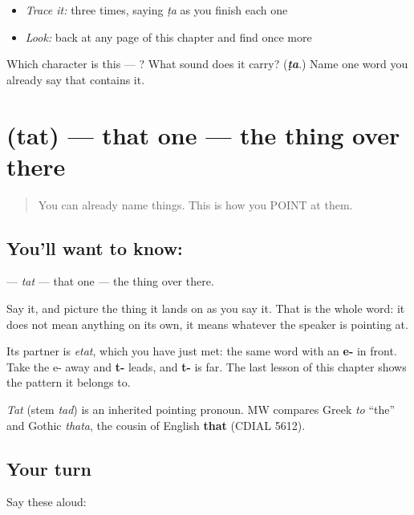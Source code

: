 \begin{itemize}
\raggedright
  \item \emph{Trace it:}  three times, saying \emph{ṭa} as you finish each one
  \item \emph{Look:} back at any page of this chapter and find  once more
\end{itemize}

\begin{tcolorbox}[breakable,colback=teal!4,colframe=teal!35!black,title={Before you move on}]
Which character is this — ? What sound does it carry? (\emph{\textbf{ṭa}}.) Name one word you already say that contains it.
\end{tcolorbox}
\section[\texorpdfstring{\sk{तत्} (tat)}{तत् (tat)}]{ (tat) — that one — the thing over there}

\label{lesson:SA-C14-that}



\begin{quote}
You can already name things. This is how you POINT at them.
\end{quote}

\subsection*{You'll want to know: }
\textbf{} — \emph{tat} — that one — the thing over there.

Say it, and picture the thing it lands on as you say it. That is the whole word: it does not mean anything on its own, it means whatever the speaker is pointing at.

Its partner is \textbf{} \emph{etat}, which you have just met: the same word with an \textbf{e-} in front. Take the e- away and \textbf{t-} leads, and \textbf{t-} is far. The last lesson of this chapter shows the pattern it belongs to.

\begin{cousinweb}
\emph{Tat} (stem \emph{tad}) is an inherited pointing pronoun. MW compares Greek \emph{to} \textquotedblleft{}the\textquotedblright{} and Gothic \emph{thata}, the cousin of English \textbf{that} (CDIAL 5612).
\end{cousinweb}

\subsection*{Your turn}
Say these aloud:


